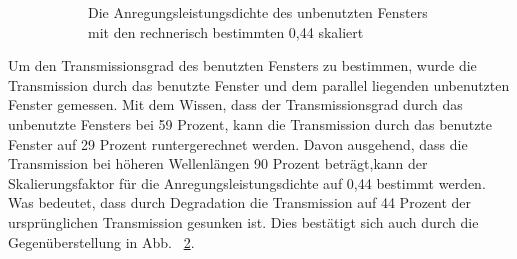 \begin{figure}[htb]
\begin{subfigure}{0.40\textwidth}
    \caption{Die Anregungsleistungsdichte des unbenutzten Fensters mit den rechnerisch bestimmten 0,44 skaliert}
    \label{fig:sub2}
  \end{subfigure}
  \caption{}
  \label{fig:vergleichSkaliert}
\end{figure}
%
Um den Transmissionsgrad des benutzten Fensters zu bestimmen, wurde die Transmission durch das benutzte Fenster und dem parallel liegenden unbenutzten Fenster gemessen. Mit dem Wissen, dass der Transmissionsgrad durch das unbenutzte Fensters bei 59 Prozent, kann die Transmission durch das benutzte Fenster auf 29 Prozent runtergerechnet werden. 
Davon ausgehend, dass die Transmission bei höheren Wellenlängen 90 Prozent beträgt,kann der Skalierungsfaktor für die Anregungsleistungsdichte auf 0,44 bestimmt werden. Was bedeutet, dass durch Degradation die Transmission auf 44 Prozent der ursprünglichen Transmission gesunken ist. Dies bestätigt sich auch durch die Gegenüberstellung in Abb. ~\ref{fig:vergleichSkaliert}.

